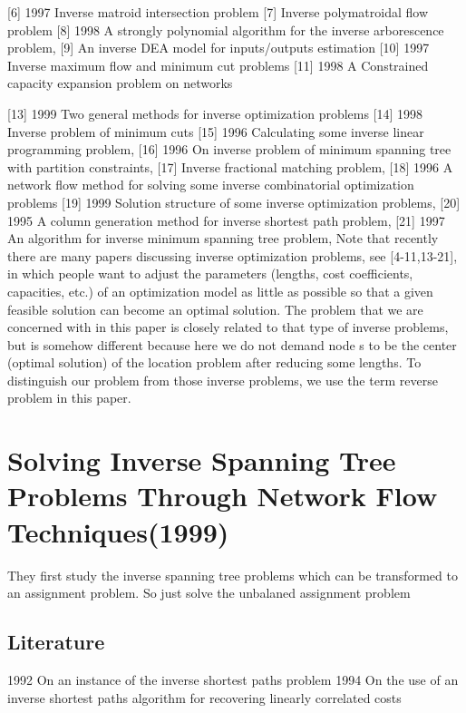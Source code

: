 \documentclass[UTF8]{article}
\begin{document}
[6] 1997 Inverse matroid intersection problem
[7] Inverse polymatroidal flow problem
[8] 1998 A strongly polynomial algorithm for the inverse arborescence problem,
[9] An inverse DEA model for inputs/outputs estimation
[10] 1997 Inverse maximum flow and minimum cut problems
[11] 1998 A Constrained capacity expansion problem on networks

[13] 1999 Two general methods for inverse optimization problems
[14] 1998 Inverse problem of minimum cuts
[15] 1996 Calculating some inverse linear programming problem,
[16] 1996 On inverse problem of minimum spanning tree with partition constraints,
[17] Inverse fractional matching problem,
[18] 1996 A network flow method for solving some inverse combinatorial optimization problems
[19] 1999 Solution structure of some inverse optimization problems,
[20] 1995 A column generation method for inverse shortest path problem,
[21] 1997 An algorithm for inverse minimum spanning tree problem,
Note that recently there are many papers discussing inverse optimization problems, see [4-11,13-21], in which people want to adjust the parameters (lengths, cost coefficients,
capacities, etc.) of an optimization model as little as possible so that a given feasible solution can become an optimal solution. The problem that we are concerned with in this paper is closely related to that type of inverse problems, but is somehow different because here we do not demand node s to be the center (optimal solution) of the location problem after reducing some lengths. To distinguish our problem from those inverse problems, we use the term reverse problem in this paper.



\section{Solving Inverse Spanning Tree Problems Through Network Flow Techniques(1999)}

They ﬁrst study the inverse spanning tree problems which can be transformed to an assignment problem. So just solve the unbalaned assignment problem

\subsection{Literature}

1992 On an instance of the inverse shortest paths problem
1994 On the use of an inverse shortest paths algorithm for recovering linearly correlated costs
\end{document}
